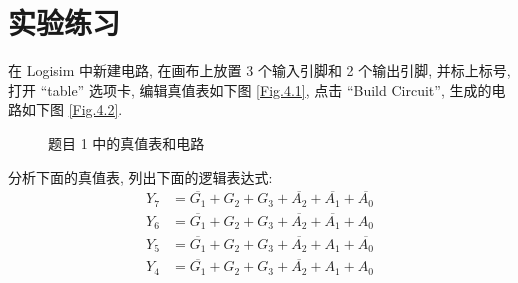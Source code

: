 \documentclass[UTF8,fontset=fandol]{ctexart}
\begin{document}
\section*{实验练习}
\begin{ExQuestions}
  \question 在 Logisim 中新建电路, 在画布上放置 3 个输入引脚和 2 个输出引脚, 并标上标号, 打开 ``table'' 选项卡, 编辑真值表如下图 \ref{Fig.4.1}, 点击 ``Build Circuit'', 生成的电路如下图 \ref{Fig.4.2}.
  \begin{figure}[H]
    \centering
    \label{Fig.4}
    \caption{题目 1 中的真值表和电路}
  \end{figure}
  \newpage
  \question 分析下面的真值表, 列出下面的逻辑表达式:
  \begin{align*}
    Y_7 &= \overline{G_1} + {G_2} + {G_3} + \overline{A_2} + \overline{A_1} + \overline{A_0} \\
    Y_6 &= \overline{G_1} + {G_2} + {G_3} + \overline{A_2} + \overline{A_1} + {A_0} \\
    Y_5 &= \overline{G_1} + {G_2} + {G_3} + \overline{A_2} + {A_1} + \overline{A_0} \\
    Y_4 &= \overline{G_1} + {G_2} + {G_3} + \overline{A_2} + {A_1} + {A_0} \\

\end{align*}
\end{ExQuestions}
\end{document}
